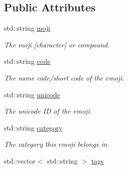 \subsection*{Public Attributes}
\begin{DoxyCompactItemize}
\item 
std\+::string \hyperlink{classEmojidex_1_1Data_1_1Emoji_a4503be17248d982d5574779ffc0bb2eb}{moji}
\begin{DoxyCompactList}\small\item\em The moji \mbox{[}character\mbox{]} or compound. \end{DoxyCompactList}\item 
std\+::string \hyperlink{classEmojidex_1_1Data_1_1Emoji_ad098cea296b8389c4162467763effb72}{code}\hypertarget{classEmojidex_1_1Data_1_1Emoji_ad098cea296b8389c4162467763effb72}{}\label{classEmojidex_1_1Data_1_1Emoji_ad098cea296b8389c4162467763effb72}

\begin{DoxyCompactList}\small\item\em The name code/short code of the emoji. \end{DoxyCompactList}\item 
std\+::string \hyperlink{classEmojidex_1_1Data_1_1Emoji_a43e461b83bd1db8a8ca1f22b197a7a48}{unicode}\hypertarget{classEmojidex_1_1Data_1_1Emoji_a43e461b83bd1db8a8ca1f22b197a7a48}{}\label{classEmojidex_1_1Data_1_1Emoji_a43e461b83bd1db8a8ca1f22b197a7a48}

\begin{DoxyCompactList}\small\item\em The unicode ID of the emoji. \end{DoxyCompactList}\item 
std\+::string \hyperlink{classEmojidex_1_1Data_1_1Emoji_a68441e044bc480a77e7fb0eaebd61d14}{category}\hypertarget{classEmojidex_1_1Data_1_1Emoji_a68441e044bc480a77e7fb0eaebd61d14}{}\label{classEmojidex_1_1Data_1_1Emoji_a68441e044bc480a77e7fb0eaebd61d14}

\begin{DoxyCompactList}\small\item\em The category this emoji belongs in. \end{DoxyCompactList}\item 
std\+::vector$<$ std\+::string $>$ \hyperlink{classEmojidex_1_1Data_1_1Emoji_a31fc45978cc598ce1a22e8e9acb5ba44}{tags}\hypertarget{classEmojidex_1_1Data_1_1Emoji_a31fc45978cc598ce1a22e8e9acb5ba44}{}\label{classEmojidex_1_1Data_1_1Emoji_a31fc45978cc598ce1a22e8e9acb5ba44}


\end{DoxyCompactItemize}
